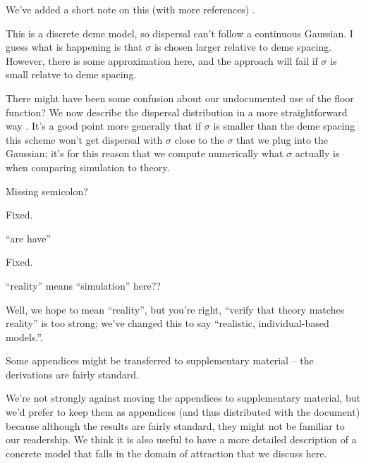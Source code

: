 \reply
We've added a short note on this (with more references) \revref.

\begin{point}{\revref}
This is a discrete deme model, so dispersal can't follow a continuous Gaussian. 
I guess what is happening is that $\sigma$ is chosen larger relative to deme spacing.  
However, there is some approximation here, and the approach will fail if $\sigma$ is small relatve to deme spacing.
\end{point}

\reply
There might have been some confusion about our undocumented use of the floor function?
We now describe the dispersal distribution in a more straightforward way \revref.
It's a good point more generally that if $\sigma$ is smaller than the deme spacing this scheme won't get dispersal with $\sigma$ close to the $\sigma$ that we plug into the Gaussian;
it's for this reason that we compute numerically what $\sigma$ actually is when comparing simulation to theory.

\begin{point}{}
Missing semicolon?
\end{point}

\reply
Fixed.

\begin{point}{}
``are have''
\end{point}

\reply
Fixed.

\begin{point}{\revref}
``reality'' means ``simulation'' here??
\end{point}

\reply
Well, we hope to mean ``reality'', but you're right, ``verify that theory matches reality'' is too strong; we've changed this to say ``realistic, individual-based models.''.

\begin{point}{}
 Some appendices might be transferred to supplementary material -- the derivations are fairly standard.
\end{point}

\reply
We're not strongly against moving the appendices to supplementary material,
but we'd prefer to keep them as appendices (and thus distributed with the document)
because although the results are fairly standard, 
they might not be familiar to our readership.  
We think it is also useful to have a more detailed description of a concrete model
that falls in the domain of attraction that we discuss here.


